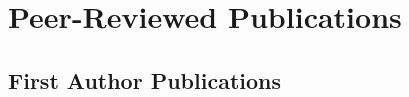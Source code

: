 \documentclass[10pt,letterpaper]{article}
\begin{document}



\renewcommand{\refname}{}
\section*{Peer-Reviewed Publications}

\subsection*{First Author Publications}
\begin{bibunit}[bibstyle]


\nocite{2017MNRAS.471.1709G}  %
\nocite{2017MNRAS.464.3108G}  %
\nocite{2014MNRAS.444..961G}  %
\nocite{2014MNRAS.444..222G}  %
\nocite{2014MNRAS.438.2578G}  %
\nocite{2013MNRAS.433.3539G}  %
\vspace{-3em}
\putbib[mypubs]
\end{bibunit}
\end{document}
